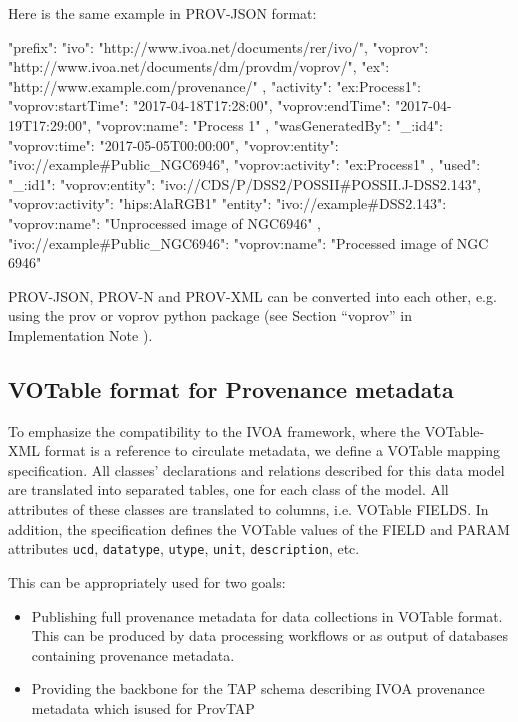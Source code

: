 \noindent
Here is the same example in PROV-JSON format:
\begin{verbnobox}[\scriptsize]
{
  "prefix": {
    "ivo": "http://www.ivoa.net/documents/rer/ivo/",
    "voprov": "http://www.ivoa.net/documents/dm/provdm/voprov/",
    "ex": "http://www.example.com/provenance/"
  },
  "activity": {
    "ex:Process1": {
      "voprov:startTime": "2017-04-18T17:28:00",
      "voprov:endTime": "2017-04-19T17:29:00",
      "voprov:name": "Process 1"
    }
  },
  "wasGeneratedBy": {
    "_:id4": {
      "voprov:time": "2017-05-05T00:00:00",
      "voprov:entity": "ivo://example#Public_NGC6946",
      "voprov:activity": "ex:Process1"
    }
  },
  "used": {
    "_:id1": {
      "voprov:entity": "ivo://CDS/P/DSS2/POSSII#POSSII.J-DSS2.143",
      "voprov:activity": "hips:AlaRGB1"
    }
  }
  "entity": {
    "ivo://example#DSS2.143": {
      "voprov:name": "Unprocessed image of NGC6946"
    },
    "ivo://example#Public_NGC6946": {
      "voprov:name": "Processed image of NGC 6946"
    }
  }
}
\end{verbnobox}
\noindent
PROV-JSON, PROV-N and PROV-XML can be converted into each other, e.g.  using the prov or voprov python package (see Section ``voprov'' in Implementation Note \citep{std:ProvenanceImplementationNote}).

\subsection{VOTable format for Provenance metadata} 
To emphasize the compatibility to the IVOA framework, where the VOTable-XML
format is a reference to circulate metadata, we define a VOTable mapping
specification. All classes' declarations and relations described for this data model are translated into separated tables, one for each class of the model.
All attributes of these classes are
translated to columns, i.e. VOTable FIELDS. In addition, the specification
defines the VOTable values of the FIELD and PARAM attributes \texttt{ucd},
\texttt{datatype}, \texttt{utype}, \texttt{unit}, \texttt{description}, etc.

This can be appropriately used for two goals:
\begin{itemize}
	\item Publishing full provenance metadata for data collections in VOTable format. This can be produced by data processing workflows or as output of databases containing provenance metadata.
	\item Providing the backbone for the TAP schema describing IVOA provenance metadata which isused for ProvTAP 
\end{itemize}

